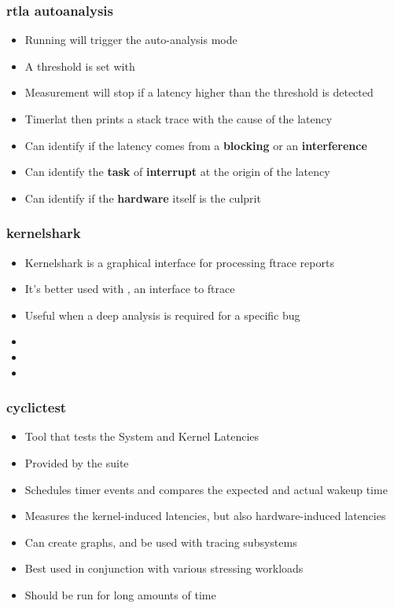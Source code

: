 \begin{frame}
        \frametitle{rtla autoanalysis}
        \begin{itemize}
                \item Running  will trigger the auto-analysis mode
                \item A threshold is set with 
                \item Measurement will stop if a latency higher than the threshold is detected
                \item Timerlat then prints a stack trace with the cause of the latency
                \item Can identify if the latency comes from a \textbf{blocking} or an \textbf{interference}
                \item Can identify the \textbf{task} of \textbf{interrupt} at the origin of the latency
                \item Can identify if the \textbf{hardware} itself is the culprit
        \end{itemize}
\end{frame}

\begin{frame}
        \frametitle{kernelshark}
        \begin{itemize}
                \item Kernelshark is a graphical interface for processing ftrace reports
                \item It's better used with , an interface to ftrace
                \item Useful when a deep analysis is required for a specific bug 
                \item {}
                \item {}
                \item {}
        \end{itemize}
\end{frame}

\begin{frame}
        \frametitle{cyclictest}
        \begin{itemize}
                \item Tool that tests the System and Kernel Latencies
                \item Provided by the  suite
                \item Schedules timer events and compares the expected and actual wakeup time
                \item Measures the kernel-induced latencies, but also hardware-induced latencies
                \item Can create graphs, and be used with tracing subsystems
                \item Best used in conjunction with various stressing workloads
                \item Should be run for long amounts of time
        \end{itemize}
\end{frame}

